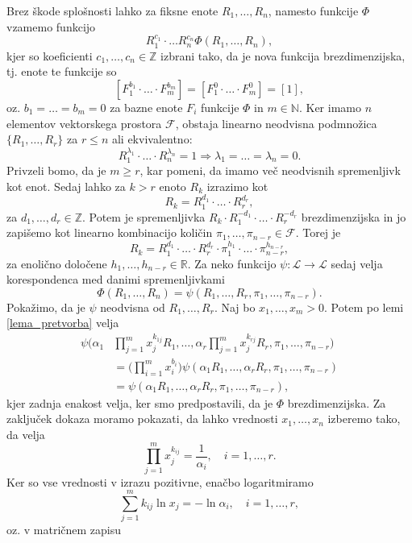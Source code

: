 \documentclass[mat2, tisk]{fmfdelo}
\newcommand{\R}{\mathbb R}
\newcommand{\N}{\mathbb N}
\newcommand{\Z}{\mathbb Z}
\begin{document}
\begin{dokaz}
Brez škode splošnosti lahko za fiksne enote $R_1, \dots, R_n$, namesto funkcije $\Phi$ vzamemo funkcijo 
$$
R_1^{c_1} \cdot \ldots R_n^{c_n} \Phi(R_1, \dots, R_n),
$$
kjer so koeficienti $c_1, \dots, c_n \in \Z$ izbrani tako, da je 
nova funkcija brezdimenzijska, tj. enote te funkcije so 
$$
[F_1^{b_1} \cdot \ldots \cdot F_m^{b_m}] = [F_1^0 \cdot \ldots \cdot F_m^{0}] = [1],
$$
oz. $b_1 = \dots = b_m = 0$ za bazne enote $F_i$ funkcije $\Phi$ in $m\in \N$.
Ker imamo $n$ elementov vektorskega prostora $\mathcal{F}$, obstaja 
linearno neodvisna podmnožica $\{R_1, \dots, R_r\}$ za $r \leq n$ ali 
ekvivalentno:
$$
R_1^{\lambda_1} \cdot \ldots \cdot R_n^{\lambda_n} = 1 \Longrightarrow \lambda_1 = \dots = \lambda_n = 0.
$$
Privzeli bomo, da je $m\geq r$, kar pomeni, da imamo več neodvisnih spremenljivk kot enot. Sedaj lahko za $k > r$ enoto $R_k$ izrazimo kot 
$$
R_k = R_1^{d_1}\cdot \ldots \cdot R_r^{d_r},
$$
za $d_1, \dots, d_r \in \Z$. Potem je spremenljivka 
$R_k \cdot R_1^{-d_1}\cdot \ldots \cdot R_r^{-d_r}$ brezdimenzijska 
in jo zapišemo kot linearno kombinacijo količin $\pi_1, \dots, \pi_{n-r} \in \mathcal{F}$. Torej je
$$
R_k = R_1^{d_1}\cdot \ldots \cdot R_r^{d_r} \cdot \pi_1^{h_1} \cdot \ldots \cdot \pi_{n-r}^{h_{n-r}},
$$
za enolično določene $h_1, \dots, h_{n-r} \in \R$. Za neko funkcijo
$\psi: \mathcal{L} \rightarrow \mathcal{L}$ sedaj velja korespondenca med 
danimi spremenljivkami 
$$
\Phi(R_1, \dots, R_n) = \psi(R_1, \dots, R_r, \pi_1, \dots, \pi_{n-r}).
$$
Pokažimo, da je $\psi$ neodvisna od $R_1, \dots, R_r$. Naj bo 
$x_1, \dots, x_m > 0$. Potem po lemi \ref{lema_pretvorba} velja 
\begin{align*}
\psi\Big(\alpha_1 &\prod_{j=1}^m x_j^{k_{1j}} R_1, \dots, \alpha_r \prod_{j=1}^m x_j^{k_{rj}} R_r, \pi_1, \dots, \pi_{n-r}\Big) \\
&= \Big(\prod_{i=1}^m x_i^{b_i}\Big) \psi(\alpha_1 R_1, \dots, \alpha_r R_r, \pi_1, \dots, \pi_{n-r}) \\
&= \psi(\alpha_1 R_1, \dots, \alpha_r R_r, \pi_1, \dots, \pi_{n-r}),
\end{align*}
kjer zadnja enakost velja, ker smo predpostavili, da je $\Phi$ brezdimenzijska.
Za zaključek dokaza moramo pokazati, da lahko vrednosti $x_1, \dots, x_n$
izberemo tako, da velja 
$$
\prod_{j=1}^m x_j^{k_{ij}} = \frac{1}{\alpha_i}, \quad i = 1, \dots, r.
$$
Ker so vse vrednosti v izrazu pozitivne, enačbo logaritmiramo 
$$
\sum_{j=1}^m k_{ij} \ln{x_j} = - \ln{\alpha_i},  \quad i = 1, \dots, r,
$$
oz. v matričnem zapisu


\end{dokaz}
\end{document}
